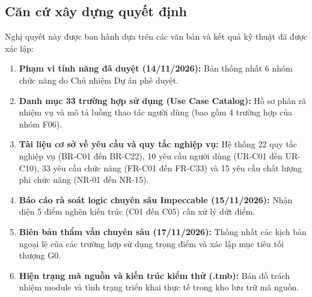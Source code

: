 \documentclass[10pt,a4paper]{article}
\begin{document}
\subsection{Căn cứ xây dựng quyết định}
Nghị quyết này được ban hành dựa trên các văn bản và kết quả kỹ thuật đã được xác lập:
\begin{enumerate}[itemsep=1pt]
    \item \textbf{Phạm vi tính năng đã duyệt (14/11/2026):} Bản thống nhất 6 nhóm chức năng do Chủ nhiệm Dự án phê duyệt.
    \item \textbf{Danh mục 33 trường hợp sử dụng (Use Case Catalog):} Hồ sơ phân rã nhiệm vụ và mô tả luồng thao tác người dùng (bao gồm 4 trường hợp của nhóm F06).
    \item \textbf{Tài liệu cơ sở về yêu cầu và quy tắc nghiệp vụ:} Hệ thống 22 quy tắc nghiệp vụ (BR-C01 đến BR-C22), 10 yêu cầu người dùng (UR-C01 đến UR-C10), 33 yêu cầu chức năng (FR-C01 đến FR-C33) và 15 yêu cầu chất lượng phi chức năng (NR-01 đến NR-15).
    \item \textbf{Báo cáo rà soát logic chuyên sâu Impeccable (15/11/2026):} Nhận diện 5 điểm nghẽn kiến trúc (C01 đến C05) cần xử lý dứt điểm.
    \item \textbf{Biên bản thẩm vấn chuyên sâu (17/11/2026):} Thống nhất các kịch bản ngoại lệ của các trường hợp sử dụng trọng điểm và xác lập mục tiêu tối thượng G0.
    \item \textbf{Hiện trạng mã nguồn và kiến trúc kiểm thử (.tmb):} Bản đồ trách nhiệm module và tình trạng triển khai thực tế trong kho lưu trữ mã nguồn.
\end{enumerate}
\end{document}
